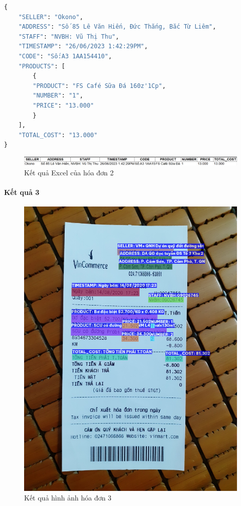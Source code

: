 \begin{lstlisting}[language=Python]
{
    "SELLER": "Okono",
    "ADDRESS": "Số 85 Lê Văn Hiến, Đức Thắng, Bắc Từ Liêm",
    "STAFF": "NVBH: Vũ Thị Thu",
    "TIMESTAMP": "26/06/2023 1:42:29PM",
    "CODE": "Số:A3 1AA154410",
    "PRODUCTS": [
        {
        "PRODUCT": "FS Café Sữa Đá 160z'1Cp",
        "NUMBER": "1",
        "PRICE": "13.000"
        }
    ],
    "TOTAL_COST": "13.000"
}
\end{lstlisting}

\begin{figure}[h]
    \includegraphics[scale=0.314]{images/result-demo-excel-2.png}
    \caption{Kết quả Excel của hóa đơn 2}
\end{figure}

\paragraph*{Kết quả 3}
\begin{figure}[h]
    \includegraphics[scale=0.3]{images/demo-image-3.png}
    \centering
    \caption{Kết quả hình ảnh hóa đơn 3}
\end{figure}


